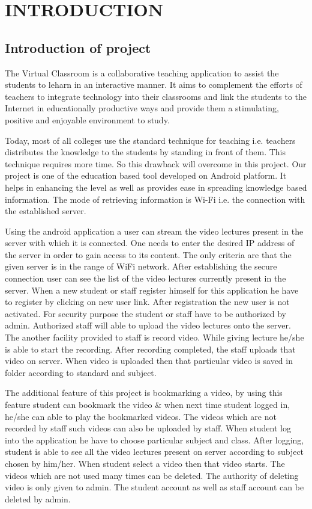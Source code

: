 
\chapter{INTRODUCTION}
\section{Introduction of project}
          The Virtual Classroom is a collaborative teaching application to assist the students to leharn in an interactive manner. It aims to complement the efforts of teachers to integrate technology into their classrooms and link the students to the Internet in educationally productive ways and provide them a stimulating, positive and enjoyable environment to study.


  Today, most of all colleges use the standard technique for teaching i.e. teachers distributes the knowledge to the students by standing in front of them. This technique requires more time. So this drawback will overcome in this project. Our project is one of the education based tool developed on Android platform. It helps in enhancing the level as well as provides ease in spreading knowledge based information. The mode of retrieving information is Wi-Fi i.e. the connection with the established server.


	Using the android application a user can stream the video lectures present in the server with which it is connected. One needs to enter the desired IP address of the server in order to gain access to its content. The only criteria are that the given server is in the range of WiFi network. After establishing the secure connection user can see the list of the video lectures currently present in the server. When a new student or staff register himself for this application he have to register by clicking on new user link. After registration the new user is not activated. For security purpose the student or staff have to be authorized by admin. Authorized staff will able to upload the video lectures onto the server. The another facility provided to staff is record video. While giving lecture he\slash she is able to start the recording. After recording completed, the staff uploads that video on server. When video is uploaded then that particular video is saved in folder according to standard and subject.


	The additional feature of this project is bookmarking a video, by using this feature student can bookmark the video \& when next time student logged in, he\slash she can able to play the bookmarked videos. The videos which are not recorded by staff such videos can also be uploaded by staff. When student log into the application he have to choose particular subject and class. After logging, student is able to see all the video lectures present on server according to subject chosen by him\slash her. When student select a video then that video starts. The videos which are not used many times can be deleted. The authority of deleting video is only given to admin. The student account as well as staff account can be deleted by admin.	





